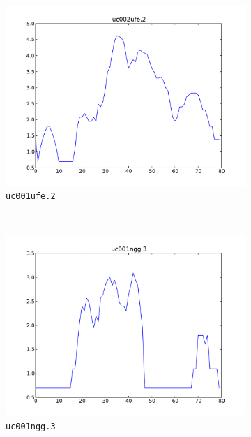 \documentclass[parskip]{cs4rep}
\newcommand{\gene}[1]{{\tt #1}}
\begin{document}
\begin{figure}[t,b]
    ~
    \begin{subfigure}[b]{0.3\textwidth}
        \centering
        \includegraphics[width=\textwidth]{figures/evaluation/exon_stretching/uc002ufe_2.pdf}
        \caption{\gene{uc001ufe.2}}
        \label{fig:evaluation:exon_stretching:seeds:c}
    \end{subfigure}
    ~
    \begin{subfigure}[b]{0.3\textwidth}
        \centering
        \includegraphics[width=\textwidth]{figures/evaluation/exon_stretching/uc001ngg_3.pdf}
        \caption{\gene{uc001ngg.3}}
        \label{fig:evaluation:exon_stretching:seeds:d}
    \end{subfigure}
    ~
    \begin{subfigure}[b]{0.3\textwidth}

\end{subfigure}
\end{figure}
\end{document}
